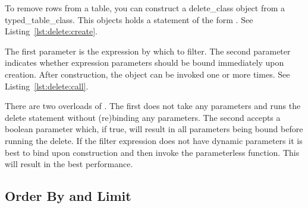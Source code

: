To remove rows from a table, you can construct a \gls{delete_class} object from a \gls{typed_table_class}. This objects holds a statement of the form \newline {}. See Listing~\ref{lst:delete:create}.



The first parameter is the expression by which to filter. The second parameter indicates whether expression parameters should be bound immediately upon creation. After construction, the object can be invoked one or more times. See Listing~\ref{lst:delete:call}.



There are two overloads of . The first does not take any parameters and runs the delete statement without (re)binding any parameters. The second accepts a boolean parameter which, if true, will result in all parameters being bound before running the delete. If the filter expression does not have dynamic parameters it is best to bind upon construction and then invoke the parameterless function. This will result in the best performance.

\subsection{Order By and Limit}

